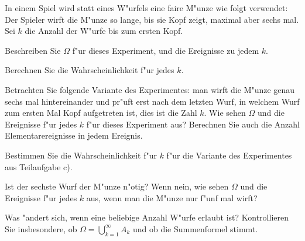 In einem Spiel wird statt eines W"urfels eine faire M"unze wie folgt verwendet:
Der Spieler wirft die M"unze so lange, bis sie Kopf zeigt, maximal aber sechs mal.
Sei $k$ die Anzahl der W"urfe bis zum ersten Kopf.
\begin{teilaufgaben}
\item
Beschreiben Sie $\Omega$ f"ur dieses Experiment, und die Ereignisse zu jedem $k$.
\item
Berechnen Sie die Wahrscheinlichkeit f"ur jedes $k$.
\item
Betrachten Sie folgende Variante des Experimentes: man wirft die M"unze genau
sechs mal hintereinander und pr"uft erst nach dem letzten Wurf, in welchem Wurf
zum ersten Mal Kopf aufgetreten ist, dies ist die Zahl $k$.
Wie sehen $\Omega$ und die Ereignisse f"ur jedes $k$ f"ur dieses Experiment aus?
Berechnen Sie auch die Anzahl Elementarereignisse in jedem Ereignis.
\item 
Bestimmen Sie die Wahrscheinlichkeit f"ur $k$ f"ur die Variante des Experimentes
aus Teilaufgabe c).
\item
Ist der sechste Wurf der M"unze n"otig? Wenn nein, wie sehen $\Omega$ und die
Ereignisse f"ur jedes $k$ aus, wenn man die M"unze nur f"unf mal wirft?
\item
Was "andert sich, wenn eine beliebige Anzahl W"urfe erlaubt ist?
Kontrollieren Sie insbesondere, ob $\Omega=\bigcup_{k=1}^\infty A_k$
und ob die Summenformel stimmt.
\end{teilaufgaben}

